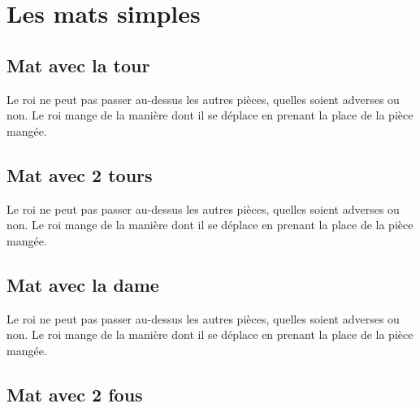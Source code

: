 \documentclass[a5paper,openany,twocolumn]{book}
\begin{document}
{\lipsum[4]


\part{Les mats simples}

\setcounter{chapter}{0}

\chapter{Mat avec la tour}
 
Le roi ne peut pas passer au-dessus les autres pièces, quelles soient adverses ou non. Le roi mange de la manière dont il se déplace en prenant la place de la pièce mangée. 


\chapter{Mat avec 2 tours}
  
Le roi ne peut pas passer au-dessus les autres pièces, quelles soient adverses ou non. Le roi mange de la manière dont il se déplace en prenant la place de la pièce mangée. 

	
\chapter{Mat avec la dame}

Le roi ne peut pas passer au-dessus les autres pièces, quelles soient adverses ou non. Le roi mange de la manière dont il se déplace en prenant la place de la pièce mangée. 


\chapter{Mat avec 2 fous}
 
}
\end{document}
